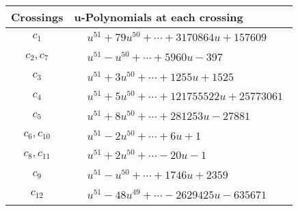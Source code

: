 \documentclass[1p]{elsarticle_modified}
\theoremstyle{definition}
\begin{document}
\begin{tabular}{m{50pt}|m{274pt}}
Crossings & \hspace{64pt}u-Polynomials at each crossing \\
\hline $$\begin{aligned}c_{1}\end{aligned}$$&$\begin{aligned}
&u^{51}+79 u^{50}+\cdots+3170864 u+157609
\end{aligned}$\\
\hline $$\begin{aligned}c_{2},c_{7}\end{aligned}$$&$\begin{aligned}
&u^{51}- u^{50}+\cdots+5960 u-397
\end{aligned}$\\
\hline $$\begin{aligned}c_{3}\end{aligned}$$&$\begin{aligned}
&u^{51}+3 u^{50}+\cdots+1255 u+1525
\end{aligned}$\\
\hline $$\begin{aligned}c_{4}\end{aligned}$$&$\begin{aligned}
&u^{51}+5 u^{50}+\cdots+121755522 u+25773061
\end{aligned}$\\
\hline $$\begin{aligned}c_{5}\end{aligned}$$&$\begin{aligned}
&u^{51}+8 u^{50}+\cdots+281253 u-27881
\end{aligned}$\\
\hline $$\begin{aligned}c_{6},c_{10}\end{aligned}$$&$\begin{aligned}
&u^{51}-2 u^{50}+\cdots+6 u+1
\end{aligned}$\\
\hline $$\begin{aligned}c_{8},c_{11}\end{aligned}$$&$\begin{aligned}
&u^{51}+2 u^{50}+\cdots-20 u-1
\end{aligned}$\\
\hline $$\begin{aligned}c_{9}\end{aligned}$$&$\begin{aligned}
&u^{51}- u^{50}+\cdots+1746 u+2359
\end{aligned}$\\
\hline $$\begin{aligned}c_{12}\end{aligned}$$&$\begin{aligned}
&u^{51}-48 u^{49}+\cdots-2629425 u-635671
\end{aligned}$\\
\hline
\end{tabular}\\~\\
\end{document}
